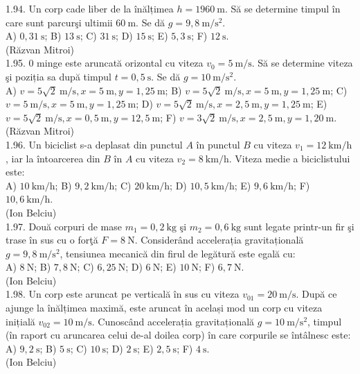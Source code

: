 1.94. Un corp cade liber de la înălțimea $h=1960 \mathrm{~m}$. Să se determine timpul în care sunt parcurşi ultimii $60 \mathrm{~m}$. Se dă $g=9,8 \mathrm{~m} / \mathrm{s}^{2}$.\\ A) $0,31 \mathrm{~s}$; B) $13 \mathrm{~s}$; C) $31 \mathrm{~s}$; D) $15 \mathrm{~s}$; E) $5,3 \mathrm{~s}$; F) $12 \mathrm{~s}$.\\ (Răzvan Mitroi)\\

1.95. 0 minge este aruncată orizontal cu viteza $v_{0}=5 \mathrm{~m} / \mathrm{s}$. Să se determine viteza şi poziția sa după timpul $t=0,5 \mathrm{~s}$. Se dă $g=10 \mathrm{~m} / \mathrm{s}^{2}$.\\ A) $v=5 \sqrt{2} \mathrm{~m} / \mathrm{s}, x=5 \mathrm{~m}, y=1,25 \mathrm{~m}$; B) $v=5 \sqrt{2} \mathrm{~m} / \mathrm{s}, x=5 \mathrm{~m}, y=1,25 \mathrm{~m}$; C) $v=5 \mathrm{~m} / \mathrm{s}, x=5 \mathrm{~m}, y=1,25 \mathrm{~m}$; D) $v=5 \sqrt{2} \mathrm{~m} / \mathrm{s}, x=2,5 \mathrm{~m}, y=1,25 \mathrm{~m}$; E) $v=5 \sqrt{2} \mathrm{~m} / \mathrm{s}, x=0,5 \mathrm{~m}, y=12,5 \mathrm{~m}$; F) $v=3 \sqrt{2} \mathrm{~m} / \mathrm{s}, x=2,5 \mathrm{~m}, y=1,20 \mathrm{~m}$.\\ (Răzvan Mitroi)\\

1.96. Un biciclist s-a deplasat din punctul $A$ în punctul $B$ cu viteza $v_{1}=12 \mathrm{~km} / \mathrm{h}$, iar la întoarcerea din $B$ în $A$ cu viteza $v_{2}=8 \mathrm{~km} / \mathrm{h}$. Viteza medie a biciclistului este:\\ A) $10 \mathrm{~km} / \mathrm{h}$; B) $9,2 \mathrm{~km} / \mathrm{h}$; C) $20 \mathrm{~km} / \mathrm{h}$; D) $10,5 \mathrm{~km} / \mathrm{h}$; E) $9,6 \mathrm{~km} / \mathrm{h}$; F) $10,6 \mathrm{~km} / \mathrm{h}$.\\ (Ion Belciu)\\

1.97. Două corpuri de mase $m_{1}=0,2 \mathrm{~kg}$ şi $m_{2}=0,6 \mathrm{~kg}$ sunt legate printr-un fir şi trase în sus cu o forţă $F=8 \mathrm{~N}$. Considerând accelerația gravitațională $g=9,8 \mathrm{~m} / \mathrm{s}^{2}$, tensiunea mecanică din firul de legătură este egală cu:\\ A) $8 \mathrm{~N}$; B) $7,8 \mathrm{~N}$; C) $6,25 \mathrm{~N}$; D) $6 \mathrm{~N}$; E) $10 \mathrm{~N}$; F) $6,7 \mathrm{~N}$.\\ (Ion Belciu)\\

1.98. Un corp este aruncat pe verticală în sus cu viteza $v_{01}=20 \mathrm{~m} / \mathrm{s}$. După ce ajunge la înălțimea maximă, este aruncat în același mod un corp cu viteza inițială $v_{02}=10 \mathrm{~m} / \mathrm{s}$. Cunoscând accelerația gravitațională $g=10 \mathrm{~m} / \mathrm{s}^{2}$, timpul (în raport cu aruncarea celui de-al doilea corp) în care corpurile se întâlnesc este:\\ A) $9,2 \mathrm{~s}$; B) $5 \mathrm{~s}$; C) $10 \mathrm{~s}$; D) $2 \mathrm{~s}$; E) $2,5 \mathrm{~s}$; F) $4 \mathrm{~s}$.\\ (Ion Belciu)\\

